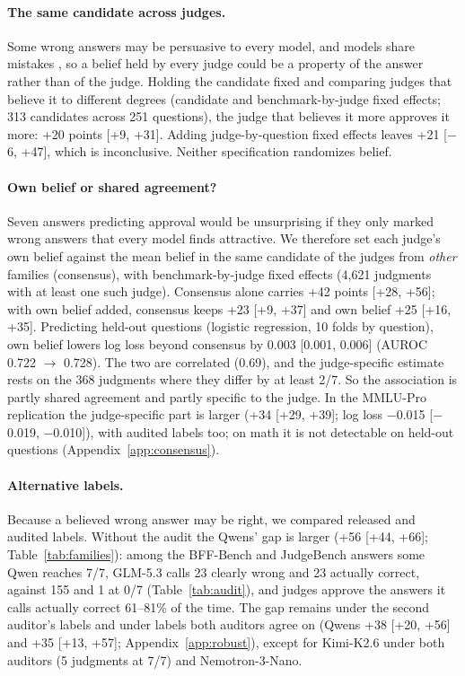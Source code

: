 \documentclass[11pt]{article}
\begin{document}
\paragraph{The same candidate across judges.}
Some wrong answers may be persuasive to every model, and models share mistakes \citep{goel2025great}, so a belief
held by every judge could be a property of the answer rather than of the judge. Holding the candidate fixed and
comparing judges that believe it to different degrees (candidate and benchmark-by-judge fixed effects; 313
candidates across 251 questions), the judge that believes it more approves it more: +20 points [+9, +31]. Adding
judge-by-question fixed effects leaves +21 [$-$6, +47], which is inconclusive. Neither specification randomizes
belief.

\paragraph{Own belief or shared agreement?}
Seven answers predicting approval would be unsurprising if they only marked wrong answers that every model finds
attractive. We therefore set each judge's own belief against the mean belief in the same candidate of the judges
from \emph{other} families (consensus), with benchmark-by-judge fixed effects (4,621 judgments with at least one
such judge). Consensus alone carries +42 points [+28, +56]; with own belief added, consensus keeps +23 [+9, +37] and
own belief +25 [+16, +35]. Predicting held-out questions (logistic regression, 10 folds by question), own belief
lowers log loss beyond consensus by 0.003 [0.001, 0.006] (AUROC 0.722 $\rightarrow$ 0.728). The two are correlated
(0.69), and the judge-specific estimate rests on the 368 judgments where they differ by at least 2/7. So the
association is partly shared agreement and partly specific to the judge. In the MMLU-Pro replication the
judge-specific part is larger (+34 [+29, +39]; log loss $-$0.015 [$-$0.019, $-$0.010]), with audited labels too; on
math it is not detectable on held-out questions (Appendix~\ref{app:consensus}).

\paragraph{Alternative labels.}
Because a believed wrong answer may be right, we compared released and audited labels. Without the audit the
Qwens' gap is larger (+56 [+44, +66]; Table~\ref{tab:families}): among the BFF-Bench and JudgeBench answers some Qwen
reaches 7/7, GLM-5.3 calls 23 clearly wrong and 23 actually correct, against 155 and 1 at 0/7 (Table~\ref{tab:audit}),
and judges approve the answers it calls actually correct 61--81\% of the time. The gap remains under the second
auditor's labels and under labels both auditors agree on (Qwens +38 [+20, +56] and +35 [+13, +57];
Appendix~\ref{app:robust}), except for Kimi-K2.6 under both auditors (5 judgments at 7/7) and Nemotron-3-Nano.
\end{document}

